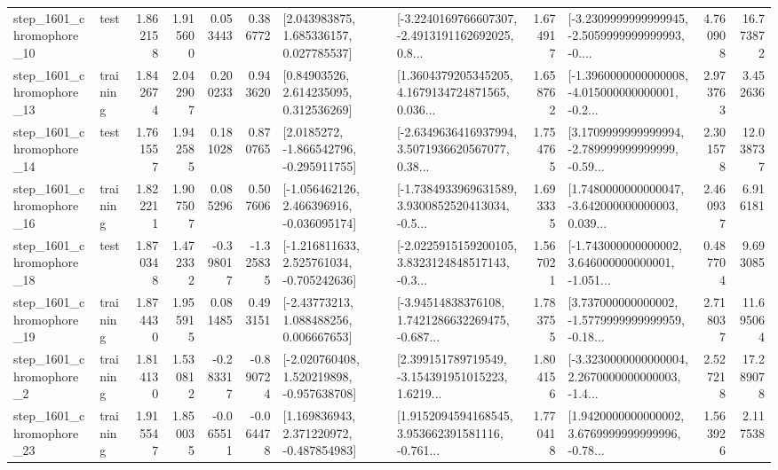 \begin{tabular}{llrrrrllrlrr}
 step\_1601\_chromophore\_10 &      test &      1.862158 &    1.915600 &      0.053443 &  0.386772 &     [2.043983875, 1.685336157, 0.027785537] &  [-3.2240169766607307, -2.4913191162692025, 0.8... &       1.674917 &  [-3.2309999999999945, -2.5059999999999993, -0.... &            4.760908 &         16.773872 \\
 step\_1601\_chromophore\_13 &  training &      1.842674 &    2.042907 &      0.200233 &  0.943620 &      [0.84903526, 2.614235095, 0.312536269] &  [1.3604379205345205, 4.1679134724871565, 0.036... &       1.658762 &  [-1.3960000000000008, -4.015000000000001, -0.2... &            2.973763 &          3.452636 \\
 step\_1601\_chromophore\_14 &      test &      1.761557 &    1.942585 &      0.181028 &  0.870765 &     [2.0185272, -1.866542796, -0.295911755] &  [-2.6349636416937994, 3.5071936620567077, 0.38... &       1.754765 &  [3.1709999999999994, -2.789999999999999, -0.59... &            2.301578 &         12.038737 \\
 step\_1601\_chromophore\_16 &  training &      1.822211 &    1.907507 &      0.085296 &  0.507606 &   [-1.056462126, 2.466396916, -0.036095174] &  [-1.7384933969631589, 3.9300852520413034, -0.5... &       1.693335 &  [1.7480000000000047, -3.642000000000003, 0.039... &            2.460937 &          6.916181 \\
 step\_1601\_chromophore\_18 &      test &      1.870348 &    1.472332 &     -0.398017 & -1.325835 &   [-1.216811633, 2.525761034, -0.705242636] &  [-2.0225915159200105, 3.8323124848517143, -0.3... &       1.567021 &  [-1.743000000000002, 3.646000000000001, -1.051... &            0.487704 &          9.693085 \\
 step\_1601\_chromophore\_19 &  training &      1.874430 &    1.955915 &      0.081485 &  0.493151 &     [-2.43773213, 1.088488256, 0.006667653] &  [-3.94514838376108, 1.7421286632269475, -0.687... &       1.783755 &  [3.737000000000002, -1.5779999999999959, -0.18... &            2.718037 &         11.695064 \\
  step\_1601\_chromophore\_2 &  training &      1.814130 &    1.530812 &     -0.283317 & -0.890724 &   [-2.020760408, 1.520219898, -0.957638708] &  [2.399151789719549, -3.154391951015223, 1.6219... &       1.804156 &  [-3.3230000000000004, 2.2670000000000003, -1.4... &            2.527218 &         17.289078 \\
 step\_1601\_chromophore\_23 &  training &      1.915547 &    1.850035 &     -0.065511 & -0.064478 &    [1.169836943, 2.371220972, -0.487854983] &  [1.9152094594168545, 3.953662391581116, -0.761... &       1.770418 &  [1.9420000000000002, 3.6769999999999996, -0.78... &            1.563926 &          2.117538 \\

\end{tabular}
